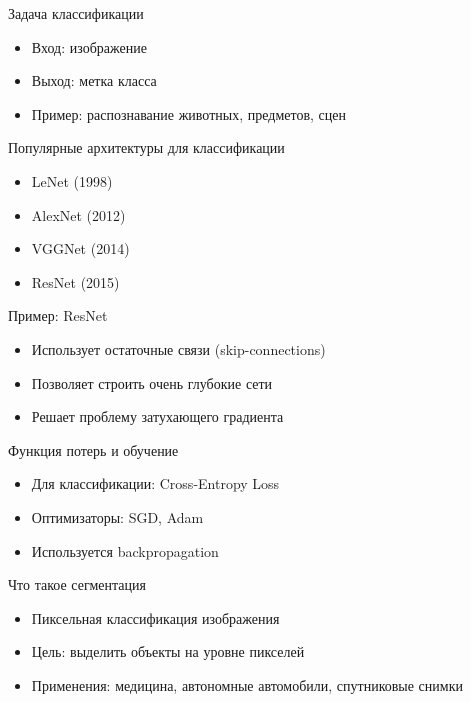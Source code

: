 \documentclass[notheorems, handout]{beamer}
\begin{document}
\begin{frame}{Задача классификации}
\begin{itemize}
    \item Вход: изображение
    \item Выход: метка класса
    \item Пример: распознавание животных, предметов, сцен
\end{itemize}
\end{frame}

\begin{frame}{Популярные архитектуры для классификации}
\begin{itemize}
    \item LeNet (1998)
    \item AlexNet (2012)
    \item VGGNet (2014)
    \item ResNet (2015)
\end{itemize}
\end{frame}

\begin{frame}{Пример: ResNet}
\begin{itemize}
    \item Использует остаточные связи (skip-connections)
    \item Позволяет строить очень глубокие сети
    \item Решает проблему затухающего градиента
\end{itemize}
\end{frame}

\begin{frame}{Функция потерь и обучение}
\begin{itemize}
    \item Для классификации: Cross-Entropy Loss
    \item Оптимизаторы: SGD, Adam
    \item Используется backpropagation
\end{itemize}
\end{frame}

\begin{frame}{Что такое сегментация}
\begin{itemize}
    \item Пиксельная классификация изображения
    \item Цель: выделить объекты на уровне пикселей
    \item Применения: медицина, автономные автомобили, спутниковые снимки
\end{itemize}
\end{frame}
\end{document}
